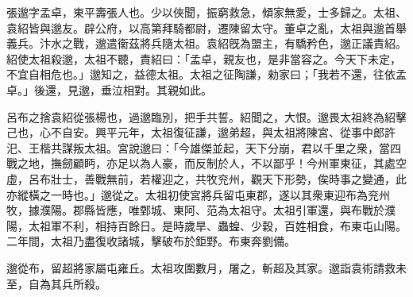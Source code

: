 \begin{pinyinscope}
 
 
 張邈字孟卓，東平壽張人也。少以俠聞，振窮救急，傾家無愛，士多歸之。太祖、袁紹皆與邈友。辟公府，以高第拜騎都尉，遷陳留太守。董卓之亂，太祖與邈首舉義兵。汴水之戰，邈遣衞茲將兵隨太祖。袁紹旣為盟主，有驕矜色，邈正議責紹。紹使太祖殺邈，太祖不聽，責紹曰：「孟卓，親友也，是非當容之。今天下未定，不宜自相危也。」邈知之，益德太祖。太祖之征陶謙，勑家曰；「我若不還，往依孟卓。」後還，見邈，垂泣相對。其親如此。
 
 
 
 
 呂布之捨袁紹從張楊也，過邈臨別，把手共誓。紹聞之，大恨。邈畏太祖終為紹擊己也，心不自安。興平元年，太祖復征謙，邈弟超，與太祖將陳宮、從事中郎許汜、王楷共謀叛太祖。宮說邈曰：「今雄傑並起，天下分崩，君以千里之衆，當四戰之地，撫劒顧眄，亦足以為人豪，而反制於人，不以鄙乎！今州軍東征，其處空虛，呂布壯士，善戰無前，若權迎之，共牧兖州，觀天下形勢，俟時事之變通，此亦縱橫之一時也。」邈從之。太祖初使宮將兵留屯東郡，遂以其衆東迎布為兖州牧，據濮陽。郡縣皆應，唯鄄城、東阿、范為太祖守。太祖引軍還，與布戰於濮陽，太祖軍不利，相持百餘日。是時歲旱、蟲蝗、少穀，百姓相食，布東屯山陽。二年間，太祖乃盡復收諸城，擊破布於鉅野。布東奔劉備。
 
 
 邈從布，留超將家屬屯雍丘。太祖攻圍數月，屠之，斬超及其家。邈詣袁術請救未至，自為其兵所殺。
 

\end{pinyinscope}
